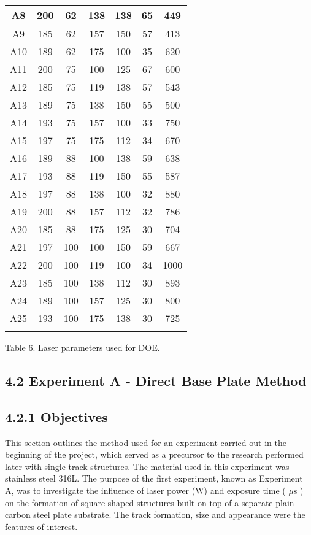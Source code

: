 \documentclass[10pt]{article}
\begin{document}
\begin{center}
\begin{tabular}{|c|c|c|c|c|c|c|}
\hline
A8 & 200 & 62 & 138 & 138 & 65 & 449 \\
\hline
A9 & 185 & 62 & 157 & 150 & 57 & 413 \\
\hline
A10 & 189 & 62 & 175 & 100 & 35 & 620 \\
\hline
A11 & 200 & 75 & 100 & 125 & 67 & 600 \\
\hline
A12 & 185 & 75 & 119 & 138 & 57 & 543 \\
\hline
A13 & 189 & 75 & 138 & 150 & 55 & 500 \\
\hline
A14 & 193 & 75 & 157 & 100 & 33 & 750 \\
\hline
A15 & 197 & 75 & 175 & 112 & 34 & 670 \\
\hline
A16 & 189 & 88 & 100 & 138 & 59 & 638 \\
\hline
A17 & 193 & 88 & 119 & 150 & 55 & 587 \\
\hline
A18 & 197 & 88 & 138 & 100 & 32 & 880 \\
\hline
A19 & 200 & 88 & 157 & 112 & 32 & 786 \\
\hline
A20 & 185 & 88 & 175 & 125 & 30 & 704 \\
\hline
A21 & 197 & 100 & 100 & 150 & 59 & 667 \\
\hline
A22 & 200 & 100 & 119 & 100 & 34 & 1000 \\
\hline
A23 & 185 & 100 & 138 & 112 & 30 & 893 \\
\hline
A24 & 189 & 100 & 157 & 125 & 30 & 800 \\
\hline
A25 & 193 & 100 & 175 & 138 & 30 & 725 \\
\hline
 &  &  &  &  &  &  \\
\hline
\end{tabular}
\end{center}

Table 6. Laser parameters used for DOE.

\subsection*{4.2 Experiment A - Direct Base Plate Method}
\subsection*{4.2.1 Objectives}
This section outlines the method used for an experiment carried out in the beginning of the project, which served as a precursor to the research performed later with single track structures. The material used in this experiment was stainless steel 316L. The purpose of the first experiment, known as Experiment A, was to investigate the influence of laser power (W) and exposure time ( $\mu \mathrm{s}$ ) on the formation of square-shaped structures built on top of a separate plain carbon steel plate substrate. The track formation, size and appearance were the features of interest.
\end{document}
